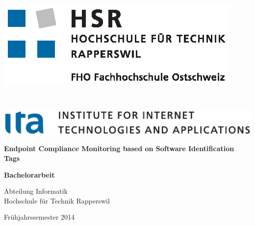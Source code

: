 
\begin{titlepage}


	\thispagestyle{empty} %



\begin{minipage}{0.5\textwidth}
	\begin{flushleft} \large
 		\includegraphics[scale=0.9]{images/hsrlogo}
 	\end{flushleft}
\end{minipage}
 ~
\begin{minipage}{0.5\textwidth}
	\begin{flushright} \large
		\includegraphics[scale=0.5]{images/italogo}
	\end{flushright}
\end{minipage}

\vspace{80pt}

\begin{center}
	{ \Huge \bfseries Endpoint Compliance Monitoring based on Software Identification Tags}\\
\end{center}
\vspace{20pt}
\begin{center}
	{ \Huge \bfseries Bachelorarbeit}
\end{center}
 
\vspace{40pt}
 
\begin{center}
	{ \huge Abteilung Informatik\\Hochschule für Technik Rapperswil}
\end{center}
\vspace{10pt}
\begin{center}
	{ \huge Frühjahrssemester 2014}
\end{center}
 

\end{titlepage}
